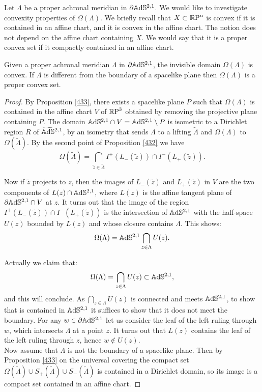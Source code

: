 Let $\Lambda$ be a proper achronal meridian in $\partial\mathbb{A}\mathrm{d}\mathbb{S}^{2,1}$. We would like to investigate convexity properties of $\Omega(\Lambda)$. We briefly recall that $X \subset \mathbb{R}\text{P}^n$ is convex if it is contained in an affine chart, and it is convex in the affine chart. The notion does not depend on the affine chart containing $X$. We would say that it is a proper convex set if it compactly contained in an affine chart. 

\begin{proposition}\label{461}
    Given a proper achronal meridian $\Lambda$ in $\partial\mathbb{A}\mathrm{d}\mathbb{S}^{2,1}$, the invisible domain $\Omega(\Lambda)$ is convex. If $\Lambda$ is different from the boundary of a spacelike plane then $\Omega(\Lambda)$ is a proper convex set.
\end{proposition}

\begin{proof}
    By Proposition \ref{433}, there exists a spacelike plane $P$ such that $\Omega(\Lambda)$ is contained in the affine chart $V$ of $\mathbb{R}\text{P}^3$ obtained by removing the projective plane containing $P$. The domain $\mathbb{A}\mathrm{d}\mathbb{S}^{2,1}\cap V=\mathbb{A}\mathrm{d}\mathbb{S}^{2,1}\setminus P$ is isometric to a Dirichlet region $R$ of $\widetilde{\mathbb{A}\mathrm{d}\mathbb{S}}{}^{2,1}$, by an isometry that sends $\Lambda$ to a lifting $\widetilde{\Lambda}$ and $\Omega(\Lambda)$ to $\Omega(\widetilde{\Lambda})$. By the second point of Proposition \ref{432} we have 
    \[
        \Omega(\widetilde{\Lambda})=\bigcap_{\widetilde{z}\in\widetilde{\Lambda}}I^+(L_-(\widetilde{z}))\cap I^-(L_+(\widetilde{z})).
    \]

    Now if $\widetilde{z}$ projects to $z$, then the images of $L_-(\widetilde{z})$ and $L_+(\widetilde{z})$ in $V$ are the two components of $L(z)\cap \mathbb{A}\mathrm{d}\mathbb{S}^{2,1}$, where $L(z)$ is the affine tangent plane of $\partial\mathbb{A}\mathrm{d}\mathbb{S}^{2,1}\cap V$ at $z$. It turns out that the image of the region $I^+(L_-(\widetilde{z}))\cap I^-(L_+(\widetilde{z}))$ is the intersection of $\mathbb{A}\mathrm{d}\mathbb{S}^{2,1}$ with the half-space $U(z)$ bounded by $L(z)$ and whose closure contains $\Lambda$. This shows: 
\[
    \Omega(\Lambda)=\mathbb{A}\mathrm{d}\mathbb{S}^{2,1}\bigcap_{z\in\Lambda}U(z).
\] 

Actually we claim that:
\[
    \Omega(\Lambda)=\bigcap_{z\in\Lambda}U(z)\subset \mathbb{A}\mathrm{d}\mathbb{S}^{2,1},
\]
and this will conclude. As $\bigcap_{z\in\Lambda}U(z)$ is connected and meets $\mathbb{A}\mathrm{d}\mathbb{S}^{2,1}$, to show that is contained in $\mathbb{A}\mathrm{d}\mathbb{S}^{2,1}$ it suffices to show that it does not meet the boundary. For any $w\in\partial\mathbb{A}\mathrm{d}\mathbb{S}^{2,1}$ let us consider the leaf of the left ruling through $w$, which intersects $\Lambda$ at a point $z$. It turns out that $L(z)$ contains the leaf of the left ruling through $z$, hence $w\notin U(z)$. \\
Now assume that $\Lambda$ is not the boundary of a spacelike plane. Then by Proposition \ref{433} on the universal covering the compact set $\Omega(\widetilde{\Lambda})\cup S_+(\widetilde{\Lambda})\cup S_-(\widetilde{\Lambda})$ is contained in a Dirichlet domain, so its image is a compact set contained in an affine chart.
\end{proof}

